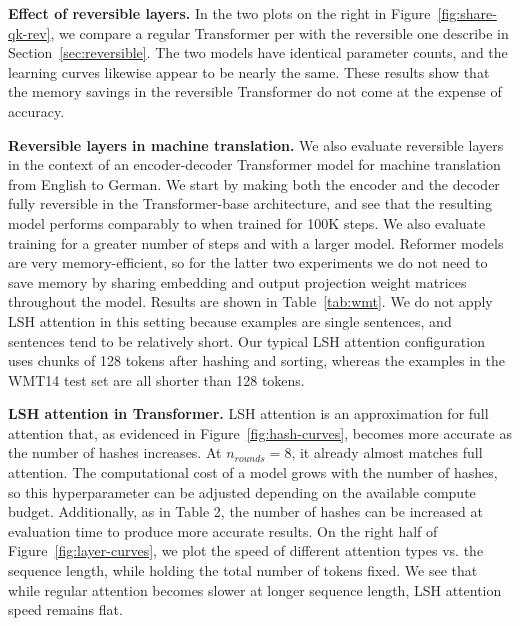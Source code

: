 \documentclass{article} %
\renewcommand{\paragraph}[1]{\textbf{#1}}
\begin{document}

\paragraph{Effect of reversible layers.} \label{sec:exp_rev}
In the two plots on the right in Figure~\ref{fig:share-qk-rev}, we compare a regular Transformer per \citet{transformer} with the reversible one describe in Section~\ref{sec:reversible}. The two models have identical parameter counts, and the learning curves likewise appear to be nearly the same. These results show that the memory savings in the reversible Transformer do not come at the expense of accuracy.

\paragraph{Reversible layers in machine translation.}
We also evaluate reversible layers in the context of an encoder-decoder Transformer model for machine translation from English to German. We start by making both the encoder and the decoder fully reversible in the Transformer-base architecture, and see that the resulting model performs comparably to \citet{transformer} when trained for 100K steps. We also evaluate training for a greater number of steps and with a larger model. Reformer models are very memory-efficient, so for the latter two experiments we do not need to save memory by sharing embedding and output projection weight matrices throughout the model. Results are shown in Table~\ref{tab:wmt}. We do not apply LSH attention in this setting because examples are single sentences, and sentences tend to be relatively short. Our typical LSH attention configuration uses chunks of 128 tokens after hashing and sorting, whereas the examples in the WMT14 test set are all shorter than 128 tokens.

\paragraph{LSH attention in Transformer.} \label{sec:exp_lsh}
LSH attention is an approximation for full attention that, as evidenced in Figure~\ref{fig:hash-curves}, becomes more accurate as the number of hashes increases. At $n_{rounds}=8$, it already almost matches full attention. The computational cost of a model grows with the number of hashes, so this hyperparameter can be adjusted depending on the available compute budget. Additionally, as in Table 2, the number of hashes can be increased at evaluation time to produce more accurate results.
On the right half of Figure~\ref{fig:layer-curves}, we plot the speed of different attention types vs. the sequence length, while holding the total number of tokens fixed. We see that while regular attention becomes slower at longer sequence length, LSH attention speed remains flat.
\end{document}
